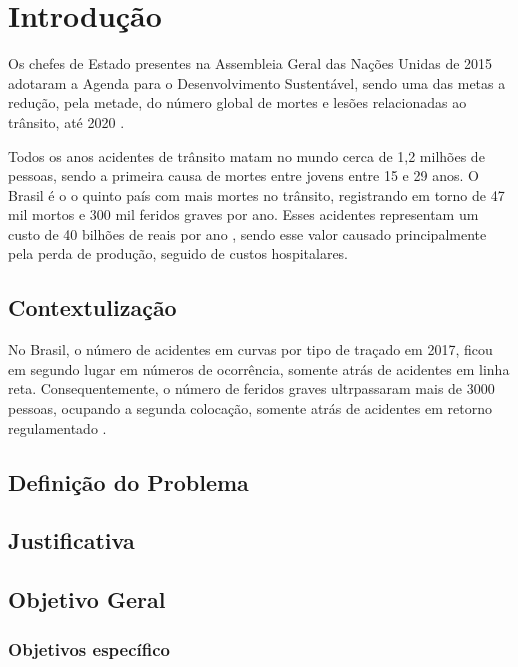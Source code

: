 \chapter{Introdução}

Os chefes de Estado presentes na Assembleia Geral das Nações Unidas de 2015 adotaram a Agenda para o Desenvolvimento Sustentável, sendo uma das metas a redução, pela metade, do número global de mortes e lesões relacionadas ao trânsito, até 2020 \cite{relatorio_oms}.

Todos os anos acidentes de trânsito matam no mundo cerca de 1,2 milhões de pessoas, sendo a primeira causa de mortes entre jovens entre 15 e 29 anos. O Brasil é o o quinto país com mais mortes no trânsito, registrando em torno de 47 mil mortos e 300 mil feridos graves por ano. Esses acidentes representam um custo de 40 bilhões de reais por ano \cite{relatorio_ipea}, sendo esse valor causado principalmente pela perda de produção, seguido de custos hospitalares.

\section{Contextulização}

No Brasil, o número de acidentes em curvas por tipo de traçado em 2017, ficou em segundo lugar em números de ocorrência, somente atrás de acidentes em linha reta. Consequentemente, o número de feridos graves ultrpassaram mais de 3000 pessoas, ocupando a segunda colocação, somente atrás de acidentes em retorno regulamentado \cite{anuario_rodoviario}.


\section{Definição do Problema}
\section{Justificativa}
\section{Objetivo Geral}
\subsection{Objetivos específico}